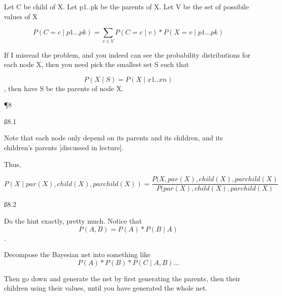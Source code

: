 Let C be child of X. Let p1..pk be the parents of X. Let V be the set of possibile values of X

\[P(C=c \mid p1\dots pk) = \sum_{v \in V} P(C=c \mid v)*P(X=v \mid p1\dots pk)\]

If I misread the problem, and you indeed can see the probability distributions for each node X, then you need pick the smallest set S such that

\[
P(X \mid S) = P(X \mid x1..xn)\], then have S be the parents of node X.

\P 8

\ss{8.1}

Note that each node only depend on its parents and its children, and its children's parents [discussed in lecture].

Thus, 

\[ P(X \mid par(X), child(X), parchild(X)) = \frac{P(X, par(X), child(X), parchild(X)}{ P(par(X), child(X), parchild(X)}
\]

\ss{8.2}

Do the hint exactly, pretty much. Notice that
\[ P(A,B) = P(A)*P(B \mid A)\].

Decompose the Bayesian net into something like 
\[P(A) * P(B) * P(C \mid A,B) \dots\]

Then go down and generate the net by first generating the parents, then their children using their values, until you have generated the whole net.


